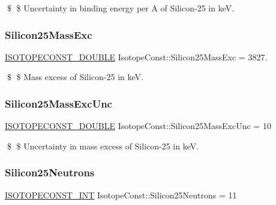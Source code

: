 \$ \$ Uncertainty in binding energy per A of Silicon-\/25 in keV. \mbox{\label{group___isotope_const-_silicon-_si25_gac37b0479742a8fa7b54ec13949ca0ddc}} 
\subsubsection{\texorpdfstring{Silicon25\+Mass\+Exc}{Silicon25MassExc}}
{\footnotesize\ttfamily \mbox{\hyperlink{group___isotope_const-_macros_ga8f45a7272ce02c0b4c65c44636ed719a}{I\+S\+O\+T\+O\+P\+E\+C\+O\+N\+S\+T\+\_\+\+D\+O\+U\+B\+LE}} Isotope\+Const\+::\+Silicon25\+Mass\+Exc = 3827.}

\$ \$ Mass excess of Silicon-\/25 in keV. \mbox{\label{group___isotope_const-_silicon-_si25_gaa70b3a476b6fbc0aa38d55d732a3bff0}} 
\subsubsection{\texorpdfstring{Silicon25\+Mass\+Exc\+Unc}{Silicon25MassExcUnc}}
{\footnotesize\ttfamily \mbox{\hyperlink{group___isotope_const-_macros_ga8f45a7272ce02c0b4c65c44636ed719a}{I\+S\+O\+T\+O\+P\+E\+C\+O\+N\+S\+T\+\_\+\+D\+O\+U\+B\+LE}} Isotope\+Const\+::\+Silicon25\+Mass\+Exc\+Unc = 10}

\$ \$ Uncertainty in mass excess of Silicon-\/25 in keV. \mbox{\label{group___isotope_const-_silicon-_si25_ga11c689aa15a27d1e19a4934526fa2df9}} 
\subsubsection{\texorpdfstring{Silicon25\+Neutrons}{Silicon25Neutrons}}
{\footnotesize\ttfamily \mbox{\hyperlink{group___isotope_const-_macros_ga5f18360b3e99483a35c32d789e62621c}{I\+S\+O\+T\+O\+P\+E\+C\+O\+N\+S\+T\+\_\+\+I\+NT}} Isotope\+Const\+::\+Silicon25\+Neutrons = 11}

